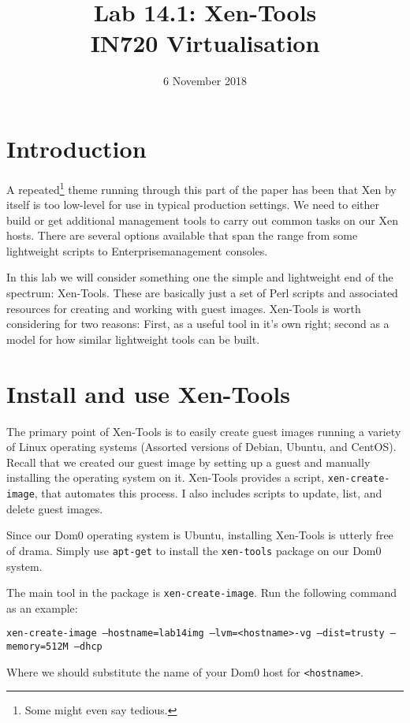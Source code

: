 \documentclass{article}
\begin{document}
\title{Lab 14.1: Xen-Tools\\ IN720 Virtualisation}
\date{6 November 2018}
\maketitle

\section*{Introduction}
A repeated\footnote{Some might even say tedious.} theme running through this part of the paper has been that Xen
by itself is too low-level for use in typical production settings. We need to either build or get additional management 
tools to carry out common tasks on our Xen hosts. There are several options available that span the range from some 
lightweight scripts to Enterprise\texttrademark management consoles.

In this lab we will consider something one the simple and lightweight end of the spectrum: Xen-Tools. These are basically just a set of Perl scripts and associated resources for creating and working with guest images. Xen-Tools is worth considering for two reasons: First, as a useful tool in it's own right; second as a model for how similar lightweight tools can be built.

\section{Install and use Xen-Tools}
The primary point of Xen-Tools is to easily create guest images running a variety of Linux operating
systems (Assorted versions of Debian, Ubuntu, and CentOS). Recall that we created our guest image 
by setting up a guest and manually installing the operating system on it. Xen-Tools provides a script,
\texttt{xen-create-image}, that automates this process. I also includes scripts to update, list, and delete 
guest images.

Since our Dom0 operating system is Ubuntu, installing Xen-Tools is utterly free of drama. Simply use 
\texttt{apt-get} to install the \texttt{xen-tools} package on our Dom0 system.

The main tool in the package is \texttt{xen-create-image}. Run the following command as an example:

\texttt{xen-create-image  --hostname=lab14img --lvm=<hostname>-vg --dist=trusty --memory=512M --dhcp}

Where we should substitute the name of your Dom0 host for \texttt{<hostname>}.
\end{document}

